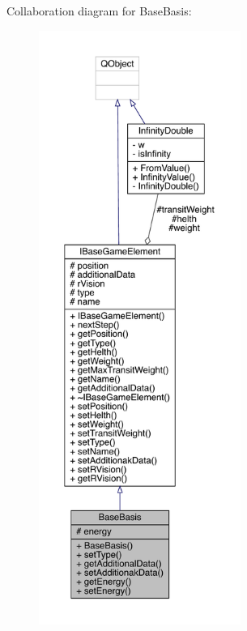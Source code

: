 Collaboration diagram for Base\+Basis\+:
\nopagebreak
\begin{figure}[H]
\begin{center}
\leavevmode
\includegraphics[height=550pt]{d0/d4a/a00147}
\end{center}
\end{figure}
